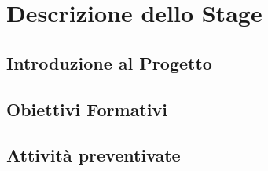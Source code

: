 
\chapter{Descrizione dello Stage}
\label{cap:capitolo2}


\section{Introduzione al Progetto}

\section{Obiettivi Formativi}

\section{Attività preventivate}